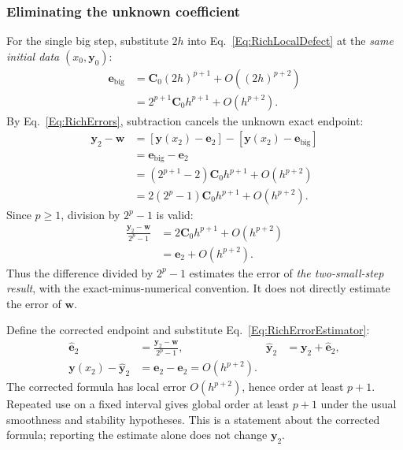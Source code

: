 \subsubsection{Eliminating the unknown coefficient}
For the single big step, substitute $2h$ into Eq.~\ref{Eq:RichLocalDefect}
at the \emph{same initial data} $(x_0,\mathbf y_0)$:
\begin{equation}\label{Eq:RichBigError}
\begin{aligned}
 \mathbf e_{\mathrm{big}}
 &=\mathbf C_0(2h)^{p+1}+O((2h)^{p+2})\\
 &=2^{p+1}\mathbf C_0h^{p+1}+O(h^{p+2}).
\end{aligned}
\end{equation}
By Eq.~\ref{Eq:RichErrors}, subtraction cancels the unknown exact endpoint:
\begin{align}
 \mathbf y_2-\mathbf w
 &=[\mathbf y(x_2)-\mathbf e_2]
       -[\mathbf y(x_2)-\mathbf e_{\mathrm{big}}]\nonumber\\
 &=\mathbf e_{\mathrm{big}}-\mathbf e_2\nonumber\\
 &=(2^{p+1}-2)\mathbf C_0h^{p+1}+O(h^{p+2})\nonumber\\
 &=2(2^p-1)\mathbf C_0h^{p+1}+O(h^{p+2}).
 \label{Eq:RichDifference}
\end{align}
Since $p\geq1$, division by $2^p-1$ is valid:
\begin{equation}\label{Eq:RichErrorEstimator}
\begin{aligned}
 \frac{\mathbf y_2-\mathbf w}{2^p-1}
 &=2\mathbf C_0h^{p+1}+O(h^{p+2})\\
 &=\mathbf e_2+O(h^{p+2}).
\end{aligned}
\end{equation}
Thus the difference divided by $2^p-1$ estimates the error of
\emph{the two-small-step result}, with the exact-minus-numerical convention.
It does not directly estimate the error of $\mathbf w$.

Define the corrected endpoint and substitute Eq.~\ref{Eq:RichErrorEstimator}:
\begin{align}
 \widehat{\mathbf e}_2&=\frac{\mathbf y_2-\mathbf w}{2^p-1},
 &\widehat{\mathbf y}_2&=\mathbf y_2+\widehat{\mathbf e}_2,
 \label{Eq:RichCorrection}\\
 \mathbf y(x_2)-\widehat{\mathbf y}_2
 &=\mathbf e_2-\widehat{\mathbf e}_2=O(h^{p+2}).
 \label{Eq:RichCorrectedError}
\end{align}
The corrected formula has local error $O(h^{p+2})$, hence order at least $p+1$.
Repeated use on a fixed interval gives global order at least $p+1$ under the
usual smoothness and stability hypotheses. This is a statement about the
corrected formula; reporting the estimate alone does not change $\mathbf y_2$.

